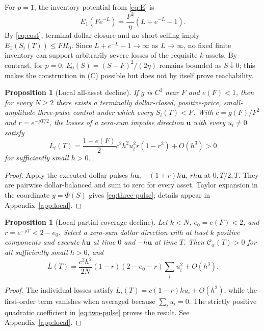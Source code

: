 \documentclass[11pt]{article}
\numberwithin{equation}{section}
\newtheorem{proposition}[theorem]{Proposition}
\theoremstyle{definition}
\theoremstyle{remark}
\newcommand{\Cris}{\mathcal{C}}
\begin{document}
For $p=1$, the inventory potential from \eqref{eq:E} is
\begin{equation}\label{eq:inventoryb}
E_1(Fe^{-L})=\frac{F^2}{\eta}\left(L+e^{-L}-1\right).
\end{equation}
By \eqref{eq:cost}, terminal dollar closure and no short selling imply $E_1(S_i(T))\le FH_0$. Since $L+e^{-L}-1\to\infty$ as $L\to\infty$, no fixed finite inventory can support arbitrarily severe losses of the requisite $k$ assets. By contrast, for $p=0$, $E_0(S)=(S-F)^2/(2\eta)$ remains bounded as $S\downarrow0$; this makes the construction in (C) possible but does not by itself prove reachability.

\begin{proposition}[Local all-asset decline]\label{prop:three-pulse}
If $g$ is $C^3$ near $F$ and $e(F)<1$, then for every $N\ge2$ there exists a terminally dollar-closed, positive-price, small-amplitude three-pulse control under which \emph{every} $S_i(T)<F$. With $c=g(F)/F^2$ and $r=e^{-\rho T/2}$, the losses of a zero-sum impulse direction $\bm u$ with every $u_i\ne0$ satisfy
\begin{equation}\label{eq:three-pulse}
L_i(T)=\frac{1-e(F)}2c^2h^2u_i^2r(1-r^2)+O(h^3)>0
\end{equation}
for sufficiently small $h>0$.
\end{proposition}
\begin{proof}
Apply the executed-dollar pulses $h\bm u$, $-(1+r)h\bm u$, $rh\bm u$ at $0,T/2,T$. They are pairwise dollar-balanced and sum to zero for every asset. Taylor expansion in the coordinate $y=\Phi(S)$ gives \eqref{eq:three-pulse}; details appear in Appendix~\ref{app:local}.
\end{proof}

\begin{proposition}[Local partial-coverage decline]\label{prop:two-pulse}
Let $k<N$, $e_0=e(F)<2$, and $r=e^{-\rho T}<2-e_0$. Select a zero-sum dollar direction with at least $k$ positive components and execute $h\bm u$ at time $0$ and $-h\bm u$ at time $T$. Then $\Cris_\alpha(T)>0$ for all sufficiently small $h>0$, and
\begin{equation}\label{eq:two-pulse}
\overline L(T)=\frac{c^2h^2}{2N}(1-r)(2-e_0-r)\sum_iu_i^2+O(h^3).
\end{equation}
\end{proposition}
\begin{proof}
The individual losses satisfy $L_i(T)=c(1-r)hu_i+O(h^2)$, while the first-order term vanishes when averaged because $\sum_i u_i=0$. The strictly positive quadratic coefficient in \eqref{eq:two-pulse} proves the result. See Appendix~\ref{app:local}.
\end{proof}
\end{document}

